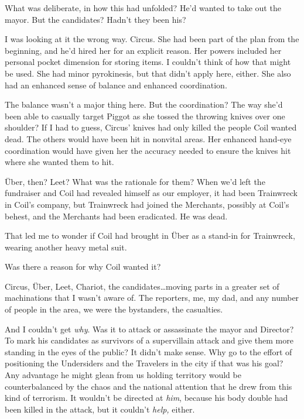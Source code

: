 What was deliberate, in how this had unfolded?  He'd wanted to take out the mayor.  But the candidates?  Hadn't they been his?



I was looking at it the wrong way.  Circus.  She had been part of the plan from the beginning, and he'd hired her for an explicit reason.  Her powers included her personal pocket dimension for storing items.  I couldn't think of how that might be used.  She had minor pyrokinesis, but that didn't apply here, either.  She also had an enhanced sense of balance and enhanced coordination.



The balance wasn't a major thing here.  But the coordination?  The way she'd been able to casually target Piggot as she tossed the throwing knives over one shoulder?  If I had to guess, Circus' knives had only killed the people Coil wanted dead.  The others would have been hit in nonvital areas.  Her enhanced hand-eye coordination would have given her the accuracy needed to ensure the knives hit where she wanted them to hit.



\"{U}ber, then?  Leet?  What was the rationale for them?  When we'd left the fundraiser and Coil had revealed himself as our employer, it had been Trainwreck in Coil's company, but Trainwreck had joined the Merchants, possibly at Coil's behest, and the Merchants had been eradicated.  He was dead.



That led me to wonder if Coil had brought in \"{U}ber as a stand-in for Trainwreck, wearing another heavy metal suit.



Was there a reason for why Coil wanted it?



Circus, \"{U}ber, Leet, Chariot, the candidates\ldots moving parts in a greater set of machinations that I wasn't aware of.  The reporters, me, my dad, and any number of people in the area, we were the bystanders, the casualties.



And I couldn't get \emph{why}.  Was it to attack or assassinate the mayor and Director?  To mark his candidates as survivors of a supervillain attack and give them more standing in the eyes of the public?  It didn't make sense.  Why go to the effort of positioning the Undersiders and the Travelers in the city if that was his goal?  Any advantage he might glean from us holding territory would be counterbalanced by the chaos and the national attention that he drew from this kind of terrorism.  It wouldn't be directed at \emph{him}, because his body double had been killed in the attack, but it couldn't \emph{help, }either.



